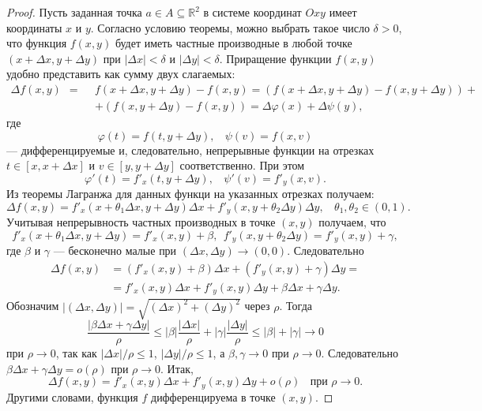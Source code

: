 \documentclass[12pt]{report}
\numberwithin{equation}{section}
\begin{document}
\begin{proof}
Пусть заданная точка $a \in A \subseteq \mathbb{R}^2$ в системе координат $Oxy$ имеет координаты $x$ и $y$. Согласно условию теоремы, можно выбрать такое число $\delta > 0$, что функция $f(x,y)$ будет иметь частные производные в любой точке $(x + \Delta x, y + \Delta y)$ при $|\Delta x| < \delta$ и $|\Delta y| < \delta$.  Приращение функции $f(x,y)$ удобно представить как сумму двух слагаемых:
\[ 
\begin{aligned}
\Delta f(x,y)  ~~=~~ &f(x + \Delta x, y + \Delta y) - f(x,y) = (f(x + \Delta x, y + \Delta y) - f(x, y + \Delta y)) +\\
&+(f(x,y + \Delta y) - f(x,y)) = \Delta \varphi(x) + \Delta \psi(y),
\end{aligned}
\]
где
\[ \varphi(t) = f(t, y + \Delta y),~~~~\psi(v) = f(x,v)\]
--- дифференцируемые и, следовательно, непрерывные функции на отрезках $t \in [x, x + \Delta x]$ и $v \in [y, y + \Delta y]$ соответственно. При этом
\[ \varphi'(t) = f'_x(t, y + \Delta y),~~~~\psi'(v) = f'_y(x,v).\]
Из теоремы Лагранжа для данных функци на указанных отрезках получаем:
\[ \Delta f(x,y) = f'_x(x + \theta_1 \Delta x, y + \Delta y)\Delta x + f'_y(x, y + \theta_2 \Delta y) \Delta y,~~~~\theta_1, \theta_2 \in (0,1).\]
Учитывая непрерывность частных производных в точке $(x,y)$ получаем, что
\[ f'_x(x + \theta_1 \Delta x, y + \Delta y) = f'_x(x,y) + \beta,~~f'_y(x, y + \theta_2 \Delta y) = f'_y (x,y) + \gamma, \]
где $\beta$ и $\gamma$ --- бесконечно малые при $(\Delta x, \Delta y) \to (0,0)$. Следовательно
\[ \begin{aligned}
\Delta f(x,y) &= (f'_x(x,y) + \beta)\Delta x + (f'_y(x,y) + \gamma)\Delta y =\\
&= f'_x(x,y)\Delta x + f'_y(x,y)\Delta y + \beta \Delta x + \gamma \Delta y.
\end{aligned}\]
Обозначим $|(\Delta x, \Delta y)| = \sqrt{(\Delta x)^2+(\Delta y)^2}$ через $\rho$. Тогда
\[ \frac{|\beta \Delta x + \gamma \Delta y|}{\rho} \leqslant |\beta| \frac{|\Delta x|}{\rho}  + |\gamma| \frac{|\Delta y|}{\rho} \leqslant |\beta| + |\gamma| \to 0\]
при $\rho \to 0$, так как $|\Delta x | / \rho \leqslant 1$, $|\Delta y| / \rho \leqslant 1$, а $\beta, \gamma \to 0$ при $\rho \to 0$. Следовательно $\beta \Delta x + \gamma \Delta y = o(\rho)$ при $\rho \to 0$. Итак,
\begin{equation}\label{eq:37:3}
\Delta f(x,y) = f'_x (x,y) \Delta x + f'_y (x,y) \Delta y + o(\rho)~~~~\text{при } \rho \to 0.\end{equation} 
Другими словами, функция $f$ дифференцируема в точке $(x,y)$.
\end{proof}
\end{document}
